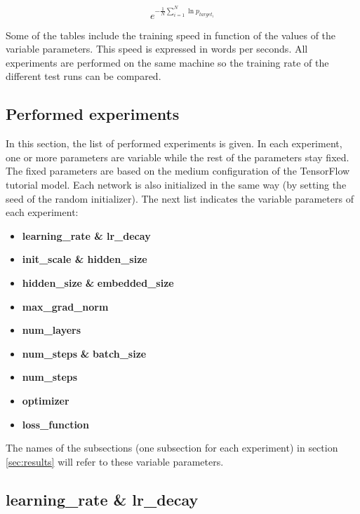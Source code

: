 \documentclass[10pt,a4paper,titlepage]{article}
\begin{document}
\[ e^{-\frac{1}{N} \sum_{i=1}^{N} \ln p_{target_{i}}} \]

\noindent
Some of the tables include the training speed in function of the values of the variable parameters. This speed is expressed in words per seconds. All experiments are performed on the same machine so the training rate of the different test runs can be compared.

\subsection{Performed experiments}
\label{subsec:perf}

In this section, the list of performed experiments is given. In each experiment, one or more parameters are variable while the rest of the parameters stay fixed. The fixed parameters are based on the medium configuration of the TensorFlow tutorial model. Each network is also initialized in the same way (by setting the seed of the random initializer). The next list indicates the variable parameters of each experiment:

\begin{itemize}
	\item \textbf{learning\_rate \& lr\_decay}
	\item \textbf{init\_scale \& hidden\_size}
	\item \textbf{hidden\_size} \textbf{\&} \textbf{embedded\_size}
	\item \textbf{max\_grad\_norm}
	\item \textbf{num\_layers}
	\item \textbf{num\_steps} \textbf{\&} \textbf{batch\_size}
	\item \textbf{num\_steps}
	\item \textbf{optimizer}
	\item \textbf{loss\_function}
\end{itemize}

\noindent
The names of the subsections (one subsection for each experiment) in section \ref{sec:results} will refer to these variable parameters.

\newpage
\subsection{learning\_rate \& lr\_decay}
\end{document}
